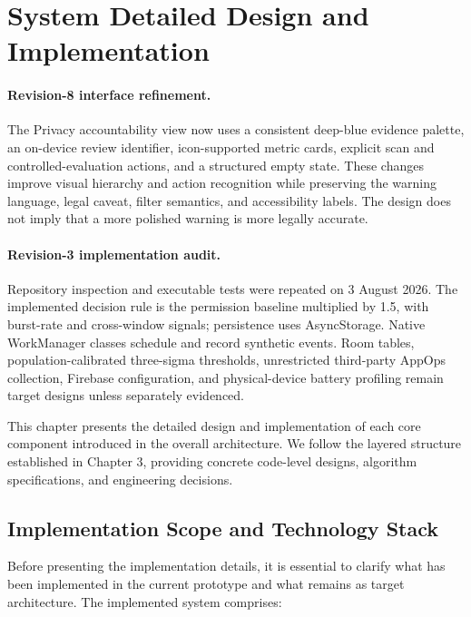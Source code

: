 \newpage
\section{System Detailed Design and Implementation}

\paragraph{Revision-8 interface refinement.} The Privacy accountability view now uses a consistent deep-blue evidence palette, an on-device review identifier, icon-supported metric cards, explicit scan and controlled-evaluation actions, and a structured empty state. These changes improve visual hierarchy and action recognition while preserving the warning language, legal caveat, filter semantics, and accessibility labels. The design does not imply that a more polished warning is more legally accurate.

\paragraph{Revision-3 implementation audit.} Repository inspection and executable tests were repeated on 3 August 2026. The implemented decision rule is the permission baseline multiplied by 1.5, with burst-rate and cross-window signals; persistence uses AsyncStorage. Native WorkManager classes schedule and record synthetic events. Room tables, population-calibrated three-sigma thresholds, unrestricted third-party AppOps collection, Firebase configuration, and physical-device battery profiling remain target designs unless separately evidenced.

This chapter presents the detailed design and implementation of each core component introduced in the overall architecture. We follow the layered structure established in Chapter 3, providing concrete code-level designs, algorithm specifications, and engineering decisions.

\subsection{Implementation Scope and Technology Stack}

Before presenting the implementation details, it is essential to clarify what has been implemented in the current prototype and what remains as target architecture. The implemented system comprises:

